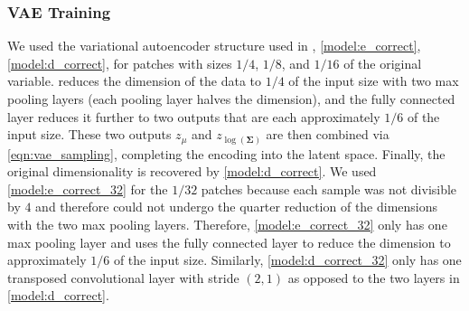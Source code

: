 \documentclass[final,3p]{elsarticle}
\theoremstyle{break}
\newcommand{\bb}[1]{\mathbf{#1}}
\begin{document}
\subsubsection{VAE Training}\label{NR:train_vae}
We used the variational autoencoder structure used in \cite{grooms2020analog}, \cref{model:e_correct},\cref{model:d_correct}, for patches with sizes $1/4$, $1/8$, and $1/16$ of the original variable.
 reduces the dimension of the data to $1/4$ of the input size with two max pooling layers (each pooling layer halves the dimension), and the fully connected layer reduces it further to two outputs that are each approximately $1/6$ of the input size. 
These two outputs $z_{\mu}$ and $z_{\log(\bb{\Sigma})}$ are then combined via \cref{eqn:vae_sampling}, completing the encoding into the latent space. 
Finally, the original dimensionality is recovered by \cref{model:d_correct}. 
We used \cref{model:e_correct_32} for the $1/32$ patches because each sample was not divisible by $4$ and therefore could not undergo the quarter reduction of the dimensions with the two max pooling layers. 
Therefore, \cref{model:e_correct_32} only has one max pooling layer and uses the fully connected layer to reduce the dimension to approximately $1/6$ of the input size.
Similarly, \cref{model:d_correct_32} only has one transposed convolutional layer with stride $(2,1)$ as opposed to the two layers in \cref{model:d_correct}.\par 
\end{document}
